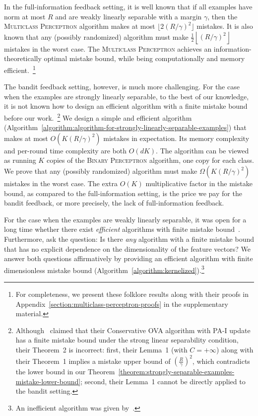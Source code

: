 In the full-information feedback setting, it is well known
\citep{Crammer-Singer-2003} that if all examples have norm at most $R$ and are
weakly linearly separable with a margin $\gamma$, then the \textsc{Multiclass
Perceptron} algorithm makes at most $\lfloor 2(R/\gamma)^2 \rfloor$ mistakes. It
is also known that any (possibly randomized) algorithm must make $\frac{1}{2}
\left\lfloor (R/\gamma)^2 \right \rfloor$ mistakes in the worst case. The
\textsc{Multiclass Perceptron} achieves an information-theoretically optimal
mistake bound, while being computationally and memory efficient.~\footnote{For
completeness, we present these folklore results along with their proofs in
Appendix~\ref{section:multiclass-perceptron-proofs} in the supplementary
material.}

The bandit feedback setting, however, is much more challenging. For the case
when the examples are strongly linearly separable, to the best of our knowledge,
it is not known how to design an efficient algorithm with a finite mistake bound
before our work.~\footnote{Although~\cite{Chen-Chen-Zhang-Chen-Zhang-2009}
claimed that their Conservative OVA algorithm with PA-I update has a finite
mistake bound under the strong linear separability condition, their
Theorem~2 is incorrect: first, their Lemma~1 (with $C = +\infty$) along with their Theorem~1
implies a mistake upper bound of
$(\frac{R}{\gamma})^2$, which contradicts the lower
bound in our Theorem~\ref{theorem:strongly-separable-examples-mistake-lower-bound};
second, their Lemma~1 cannot be directly applied to the bandit setting.} We design a simple and
efficient algorithm
(Algorithm~\ref{algorithm:algorithm-for-strongly-linearly-separable-examples})
that makes at most $O(K (R/\gamma)^2)$ mistakes in expectation. Its memory
complexity and per-round time complexity are both $O(dK)$. The algorithm can be
viewed as running $K$ copies of the \textsc{Binary Perceptron} algorithm, one
copy for each class. We prove that any (possibly randomized) algorithm must make
$\Omega(K (R/\gamma)^2)$ mistakes in the worst case. The extra $O(K)$
multiplicative factor in the mistake bound, as compared to the full-information
setting, is the price we pay for the bandit feedback, or more precisely, the
lack of full-information feedback.

For the case when the examples are weakly linearly separable, it was open for a
long time whether there exist \textit{efficient} algorithms with finite mistake
bound~\cite{Kakade-Shalev-Shwartz-Tewari-2008, Beygelzimer-Orabona-Zhang-2017}.
Furthermore, \citet{Kakade-Shalev-Shwartz-Tewari-2008} ask the question:
Is there \textit{any} algorithm with a finite mistake bound that has no explicit
dependence on the dimensionality of the feature vectors? We answer both
questions affirmatively by providing an efficient algorithm with finite
dimensionless mistake bound (Algorithm~\ref{algorithm:kernelized}).\footnote{An
inefficient algorithm was given by~\cite{Daniely-Helbertal-2013}.}

